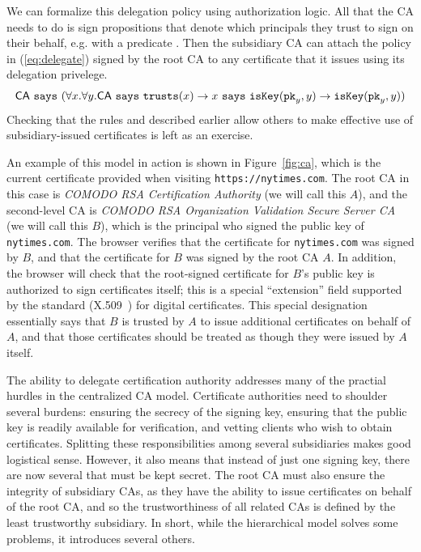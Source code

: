 \documentclass[11pt,twoside]{scrartcl}
\begin{document}
We can formalize this delegation policy using authorization logic. All that the CA needs to do is sign propositions that denote which principals they trust to  sign on their behalf, e.g. with a predicate \trusts{\cdot}. Then the subsidiary CA can attach the policy in (\ref{eq:delegate}) signed by the root CA to any certificate that it issues using its delegation privelege.
\begin{equation}
\label{eq:delegate}
\says{\ca}{(\forall x.\forall y. \says{\ca}{\trusts{x}} \limply \says{x}{\iskey{\pk{y}}{y}} \limply \iskey{\pk{y}}{{y}})}
\end{equation}
Checking that the rules  and  described earlier allow others to make effective use of subsidiary-issued certificates is left as an exercise.

An example of this model in action is shown in Figure~\ref{fig:ca}, which is the current certificate provided when visiting \nolinkurl{https://nytimes.com}. The root CA in this case is \emph{COMODO RSA Certification Authority} (we will call this $A$), and the second-level CA is \emph{COMODO RSA Organization Validation Secure Server CA} (we will call this $B$), which is the principal who signed the public key of \nolinkurl{nytimes.com}. The browser verifies that the certificate for \nolinkurl{nytimes.com} was signed by $B$, and that the certificate for $B$ was signed by the root CA $A$. In addition, the browser will check that the root-signed certificate for $B$'s public key is authorized to sign certificates itself; this is a special ``extension'' field supported by the standard (X.509~\cite{deltacrl}) for digital certificates. This special designation essentially says that $B$ is trusted by $A$ to issue additional certificates on behalf of $A$, and that those certificates should be treated as though they were issued by $A$ itself.

The ability to delegate certification authority addresses many of the practial hurdles in the centralized CA model. Certificate authorities need to shoulder several burdens: ensuring the secrecy of the signing key, ensuring that the public key is readily available for verification, and vetting clients who wish to obtain certificates. Splitting these responsibilities among several subsidiaries makes good logistical sense. However, it also means that instead of just one signing key, there are now several that must be kept secret. The root CA must also ensure the integrity of subsidiary CAs, as they have the ability to issue certificates on behalf of the root CA, and so the trustworthiness of all related CAs is defined by the least trustworthy subsidiary. In short, while the hierarchical model solves some problems, it introduces several others.
\end{document}
